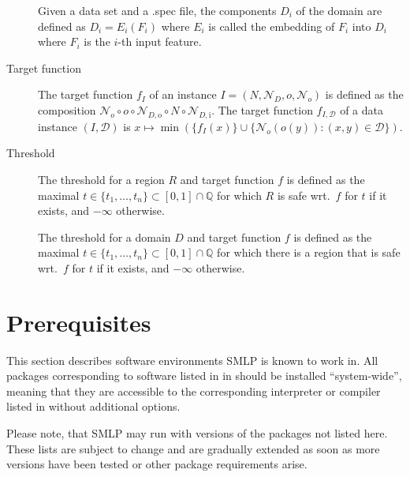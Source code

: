 \documentclass[a4paper,parskip=half]{article} %
\newcommand*\SolverAbbrvText{SMLP}
\newcommand*\SolverAbbrv{\SolverAbbrvText\xspace}
\begin{document}
\begin{description}
	Given a data set and a .spec file, the components $D_i$ of the domain
	are defined as $D_i=E_i(F_i)$ where
	$E_i$ is called the embedding of $F_i$ into $D_i$ where $F_i$ is the
	$i$-th input feature.
\item[Target function]
	The target function $f_I$ of an instance
	$I=(N,\mathcal N_D,o,\mathcal N_o)$ is defined as the composition
	$\mathcal N_o\circ o\circ\mathcal N_{D,\mathrm o}\circ
	N\circ\mathcal N_{D,\mathrm i}$.
	The target function $f_{I,\mathcal D}$ of a data instance
	$(I,\mathcal D)$ is
	$x\mapsto\min(\{f_I(x)\}\cup\{\mathcal N_o(o(y)):(x,y)\in\mathcal D\})$.
\item[Threshold]
	The threshold for a region $R$ and target function $f$ is defined
	as the maximal $t\in\{t_1,\ldots,t_n\}\subset[0,1]\cap\mathbb Q$ for
	which $R$ is safe wrt.\ $f$ for $t$ if it exists, and $-\infty$ otherwise.

	The threshold for a domain $D$ and target function $f$ is defined
	as the maximal $t\in\{t_1,\ldots,t_n\}\subset[0,1]\cap\mathbb Q$ for
	which there is a region that is safe wrt.\ $f$ for $t$ if it exists, and
	$-\infty$ otherwise.
\end{description}




\section{Prerequisites}
This section describes software environments \SolverAbbrv is known to work in.
All packages corresponding to software listed in in  should be
installed ``system-wide'',
meaning that they are accessible to the corresponding interpreter or compiler
listed in  without additional options.

Please note, that \SolverAbbrv may run with versions of the packages not listed
here. These lists are subject to change and are gradually extended as soon as
more versions have been tested or other package requirements arise.
\end{document}
